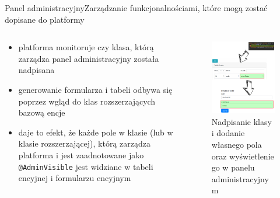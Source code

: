 \documentclass[polish,xcolor=table,9pt,aspectratio=1610,hyperref={pdfpagemode=FullScreen}]{beamer}
\begin{document}
\begin{frame}{Panel administracyjny}{Zarządzanie funkcjonalnościami, które mogą zostać dopisane do platformy}
\begin{columns}
	\begin{column}{0.5\textwidth}
	\begin{itemize}
		\item<1-> platforma monitoruje czy klasa, którą zarządza panel administracyjny została nadpisana
		\item<1-> generowanie formularza i tabeli odbywa się poprzez wgląd do klas rozszerzających bazową encje
		\item<1-> daje to efekt, że każde pole w klasie (lub w klasie rozszerzającej), którą zarządza platforma i jest zaadnotowane jako \texttt{@AdminVisible} jest widziane w tabeli encyjnej i formularzu encyjnym
	\end{itemize}
	\end{column}
	\begin{column}{0.5\textwidth}
		\begin{figure}
			\begin{center}
				\includegraphics[scale=0.2]{nadpisanieKlasNaPolaWAdminie.png}
			\end{center}
			\caption{{\color{black}Nadpisanie klasy i dodanie własnego pola oraz wyświetlenie go w panelu administracyjnym}} 
		\end{figure}
	\end{column}
\end{columns}
\end{frame}
\end{document}
